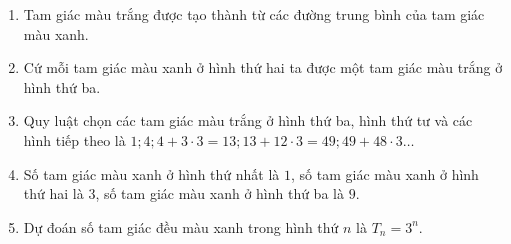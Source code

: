 \begin{bt}
{\begin{enumerate}
\item Tam giác màu trắng được tạo thành từ các đường trung bình của tam giác màu xanh.
\item Cứ mỗi tam giác màu xanh ở hình thứ hai ta được một tam giác màu trắng ở hình thứ ba.
\item Quy luật chọn các tam giác màu trắng ở hình thứ ba, hình thứ tư và các hình tiếp theo là $ 1; 4; 4+3\cdot 3=13; 13 + 12\cdot 3 = 49; 49+48\cdot 3 \ldots $ 
\item Số tam giác màu xanh ở hình thứ nhất là $ 1 $, số tam giác màu xanh ở hình thứ hai là $ 3 $, số tam giác màu xanh ở hình thứ ba là $ 9 $.
\item Dự đoán số tam giác đều màu xanh trong hình thứ $ n $ là $T_n = 3^n $.
\end{enumerate}
}
\end{bt}
